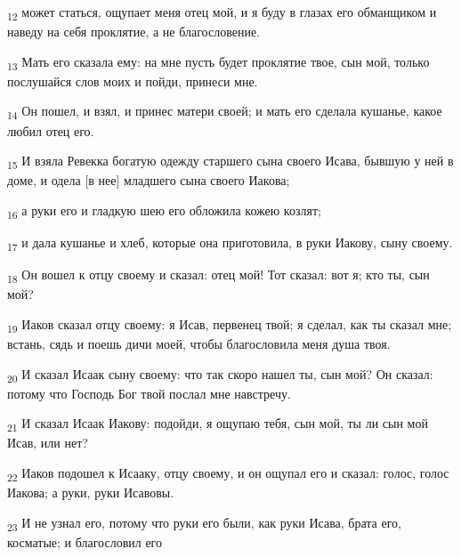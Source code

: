 \begin{tcolorbox}
\textsubscript{12} может статься, ощупает меня отец мой, и я буду в глазах его обманщиком и наведу на себя проклятие, а не благословение.
\end{tcolorbox}
\begin{tcolorbox}
\textsubscript{13} Мать его сказала ему: на мне пусть будет проклятие твое, сын мой, только послушайся слов моих и пойди, принеси мне.
\end{tcolorbox}
\begin{tcolorbox}
\textsubscript{14} Он пошел, и взял, и принес матери своей; и мать его сделала кушанье, какое любил отец его.
\end{tcolorbox}
\begin{tcolorbox}
\textsubscript{15} И взяла Ревекка богатую одежду старшего сына своего Исава, бывшую у ней в доме, и одела [в нее] младшего сына своего Иакова;
\end{tcolorbox}
\begin{tcolorbox}
\textsubscript{16} а руки его и гладкую шею его обложила кожею козлят;
\end{tcolorbox}
\begin{tcolorbox}
\textsubscript{17} и дала кушанье и хлеб, которые она приготовила, в руки Иакову, сыну своему.
\end{tcolorbox}
\begin{tcolorbox}
\textsubscript{18} Он вошел к отцу своему и сказал: отец мой! Тот сказал: вот я; кто ты, сын мой?
\end{tcolorbox}
\begin{tcolorbox}
\textsubscript{19} Иаков сказал отцу своему: я Исав, первенец твой; я сделал, как ты сказал мне; встань, сядь и поешь дичи моей, чтобы благословила меня душа твоя.
\end{tcolorbox}
\begin{tcolorbox}
\textsubscript{20} И сказал Исаак сыну своему: что так скоро нашел ты, сын мой? Он сказал: потому что Господь Бог твой послал мне навстречу.
\end{tcolorbox}
\begin{tcolorbox}
\textsubscript{21} И сказал Исаак Иакову: подойди, я ощупаю тебя, сын мой, ты ли сын мой Исав, или нет?
\end{tcolorbox}
\begin{tcolorbox}
\textsubscript{22} Иаков подошел к Исааку, отцу своему, и он ощупал его и сказал: голос, голос Иакова; а руки, руки Исавовы.
\end{tcolorbox}
\begin{tcolorbox}
\textsubscript{23} И не узнал его, потому что руки его были, как руки Исава, брата его, косматые; и благословил его
\end{tcolorbox}
